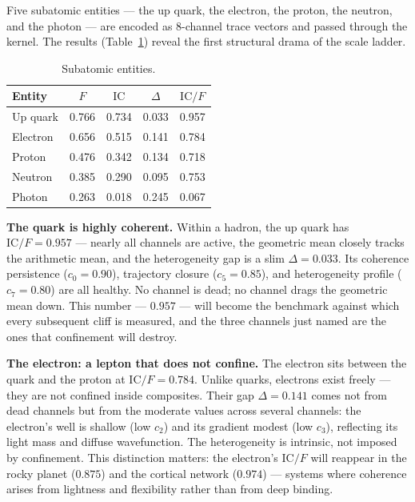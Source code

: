 \documentclass[
  aps,
  prd,
  twocolumn,
  superscriptaddress,
  nofootinbib,
  floatfix
]{revtex4-2}
\newcommand{\IC}{\mathrm{IC}}
\begin{document}
Five subatomic entities ---
the up quark, the electron, the proton, the neutron, and the
photon --- are encoded as 8-channel trace vectors and passed
through the kernel.  The results (Table~\ref{tab:subatomic})
reveal the first structural drama of the scale ladder.

\begin{table}[t]
\caption{\label{tab:subatomic}Subatomic entities.}
\begin{ruledtabular}
\begin{tabular}{lcccc}
Entity & $F$ & $\IC$ & $\Delta$ & $\IC/F$ \\
\hline
Up quark   & 0.766 & 0.734 & 0.033 & 0.957 \\
Electron   & 0.656 & 0.515 & 0.141 & 0.784 \\
Proton     & 0.476 & 0.342 & 0.134 & 0.718 \\
Neutron    & 0.385 & 0.290 & 0.095 & 0.753 \\
Photon     & 0.263 & 0.018 & 0.245 & 0.067 \\
\end{tabular}
\end{ruledtabular}
\end{table}

\textbf{The quark is highly coherent.}
Within a hadron, the up quark has $\IC/F = 0.957$ --- nearly
all channels are active, the geometric mean closely tracks the
arithmetic mean, and the heterogeneity gap is a slim $\Delta
= 0.033$.  Its coherence persistence ($c_0 = 0.90$),
trajectory closure ($c_5 = 0.85$), and heterogeneity profile
($c_7 = 0.80$) are all healthy.  No channel is dead; no
channel drags the geometric mean down.  This number ---
$0.957$ --- will become the benchmark against which every
subsequent cliff is measured, and the three channels just
named are the ones that confinement will destroy.

\textbf{The electron: a lepton that does not confine.}
The electron sits between the quark and the proton at
$\IC/F = 0.784$.  Unlike quarks, electrons exist freely ---
they are not confined inside composites.  Their gap
$\Delta = 0.141$ comes not from dead channels but from the
moderate values across several channels: the electron's
well is shallow (low $c_2$) and its gradient modest (low
$c_3$), reflecting its light mass and diffuse wavefunction.
The heterogeneity is intrinsic, not imposed by confinement.
This distinction matters: the electron's $\IC/F$ will
reappear in the rocky planet ($0.875$) and the cortical
network ($0.974$) --- systems where coherence arises from
lightness and flexibility rather than from deep binding.
\end{document}
